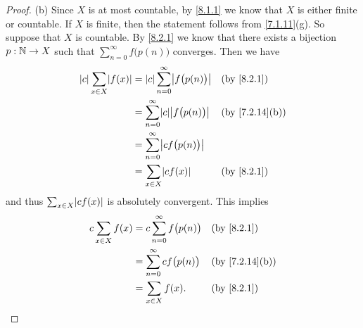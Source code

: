 \begin{proof}{(b)}
	Since \(X\) is at most countable, by \cref{8.1.1} we know that \(X\) is either finite or countable.
	If \(X\) is finite, then the statement follows from \cref{7.1.11}(g).
	So suppose that \(X\) is countable.
	By \cref{8.2.1} we know that there exists a bijection \(p : \mathbb{N} \to X\) such that \(\sum_{n = 0}^\infty f\big(p(n)\big)\) converges.
	Then we have
	\begin{align*}
		\abs{c} \sum_{x \in X} \abs{f(x)} & = \abs{c} \sum_{n = 0}^\infty \abs{f\big(p(n)\big)} &  & \by{8.2.1}                   \\
		                                  & = \sum_{n = 0}^\infty \abs{c} \abs{f\big(p(n)\big)} &  & \text{(by \cref{7.2.14}(b))} \\
		                                  & = \sum_{n = 0}^\infty \abs{c f\big(p(n)\big)}                                         \\
		                                  & = \sum_{x \in X} \abs{c f(x)}                       &  & \by{8.2.1}
	\end{align*}
	and thus \(\sum_{x \in X} \abs{c f(x)}\) is absolutely convergent.
	This implies
	\begin{align*}
		c \sum_{x \in X} f(x) & = c \sum_{n = 0}^\infty f\big(p(n)\big) &  & \by{8.2.1}                   \\
		                      & = \sum_{n = 0}^\infty c f\big(p(n)\big) &  & \text{(by \cref{7.2.14}(b))} \\
		                      & = \sum_{x \in X} f(x).                  &  & \by{8.2.1}
	\end{align*}
\end{proof}

